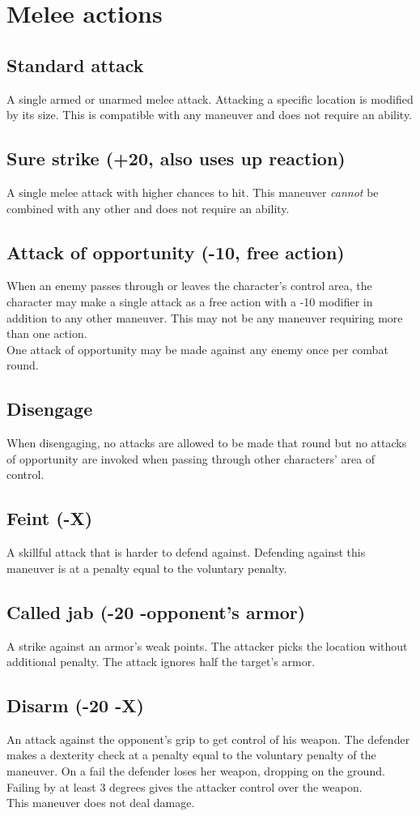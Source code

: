 \section{Melee actions}
\subsection*{Standard attack}
A single armed or unarmed melee attack. Attacking a specific location is modified by its size. This is compatible with any maneuver and does not require an ability. 
\subsection*{Sure strike (+20, also uses up reaction)}
A single melee attack with higher chances to hit. This maneuver \emph{cannot} be combined with any other and does not require an ability.
\subsection*{Attack of opportunity (-10, free action)}
When an enemy passes through or leaves the character’s control area, the character may make a single attack as a free action with a -10 modifier in addition to any other maneuver. This may not be any maneuver requiring more than one action.\\
One attack of opportunity may be made against any enemy once per combat round.
\subsection*{Disengage}
\label{action:disengage}
When disengaging, no attacks are allowed to be made that round but no attacks of opportunity are invoked when passing through other characters' area of control.
\subsection*{Feint (-X)}
A skillful attack that is harder to defend against. Defending against this maneuver is at a penalty equal to the voluntary penalty.
\subsection*{Called jab (-20 -opponent’s armor)}
A strike against an armor’s weak points. The attacker picks the location without additional penalty. The attack ignores half the target’s armor.
\subsection*{Disarm (-20 -X)}
An attack against the opponent’s grip to get control of his weapon. The defender makes a dexterity check at a penalty equal to the voluntary penalty of the maneuver. On a fail the defender loses her weapon, dropping on the ground. Failing by at least 3 degrees gives the attacker control over the weapon.\\
This maneuver does not deal damage.
